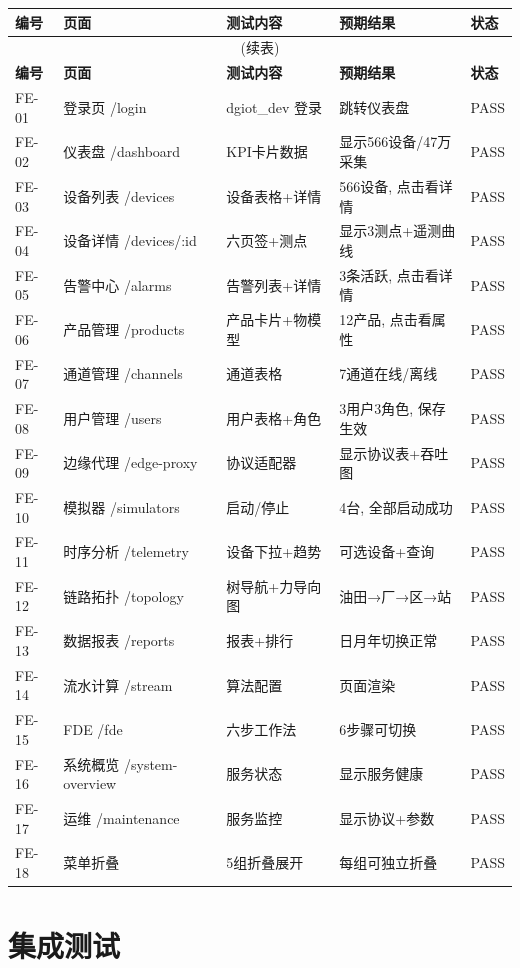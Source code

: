\documentclass[11pt,a4paper]{ctexart}
\begin{document}
\begin{longtable}{p{1.5cm} p{2.5cm} p{5cm} p{2.5cm} p{2cm}}
\toprule
\textbf{编号} & \textbf{页面} & \textbf{测试内容} & \textbf{预期结果} & \textbf{状态} \\
\midrule
\endfirsthead
\multicolumn{5}{c}{(续表)} \\
\toprule
\textbf{编号} & \textbf{页面} & \textbf{测试内容} & \textbf{预期结果} & \textbf{状态} \\
\midrule
\endhead
FE-01 & 登录页 /login & dgiot\_dev 登录 & 跳转仪表盘 & PASS \\
FE-02 & 仪表盘 /dashboard & KPI卡片数据 & 显示566设备/47万采集 & PASS \\
FE-03 & 设备列表 /devices & 设备表格+详情 & 566设备, 点击看详情 & PASS \\
FE-04 & 设备详情 /devices/:id & 六页签+测点 & 显示3测点+遥测曲线 & PASS \\
FE-05 & 告警中心 /alarms & 告警列表+详情 & 3条活跃, 点击看详情 & PASS \\
FE-06 & 产品管理 /products & 产品卡片+物模型 & 12产品, 点击看属性 & PASS \\
FE-07 & 通道管理 /channels & 通道表格 & 7通道在线/离线 & PASS \\
FE-08 & 用户管理 /users & 用户表格+角色 & 3用户3角色, 保存生效 & PASS \\
FE-09 & 边缘代理 /edge-proxy & 协议适配器 & 显示协议表+吞吐图 & PASS \\
FE-10 & 模拟器 /simulators & 启动/停止 & 4台, 全部启动成功 & PASS \\
FE-11 & 时序分析 /telemetry & 设备下拉+趋势 & 可选设备+查询 & PASS \\
FE-12 & 链路拓扑 /topology & 树导航+力导向图 & 油田→厂→区→站 & PASS \\
FE-13 & 数据报表 /reports & 报表+排行 & 日月年切换正常 & PASS \\
FE-14 & 流水计算 /stream & 算法配置 & 页面渲染 & PASS \\
FE-15 & FDE /fde & 六步工作法 & 6步骤可切换 & PASS \\
FE-16 & 系统概览 /system-overview & 服务状态 & 显示服务健康 & PASS \\
FE-17 & 运维 /maintenance & 服务监控 & 显示协议+参数 & PASS \\
FE-18 & 菜单折叠 & 5组折叠展开 & 每组可独立折叠 & PASS \\
\bottomrule
\end{longtable}

\section{集成测试}
\end{document}
